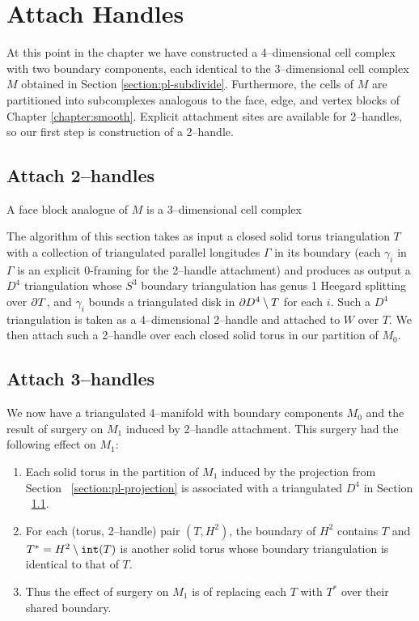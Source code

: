 \section{Attach Handles}
\label{section:pl-handle}

At this point in the chapter we have constructed a 4--dimensional cell complex with two boundary components, each identical to the 3--dimensional cell complex $M$ obtained in Section \ref{section:pl-subdivide}.
Furthermore, the cells of $M$ are partitioned into subcomplexes analogous to the face, edge, and vertex blocks of Chapter \ref{chapter:smooth}.
Explicit attachment sites are available for 2--handles, so our first step is construction of a 2--handle.

\subsection{Attach 2--handles}
\label{section:pl-2-handle}

A face block analogue of $M$ is a 3--dimensional cell complex 


The algorithm of this section takes as input a closed solid torus triangulation $T$ with a collection of triangulated parallel longitudes $\Gamma$ in its boundary (each $\gamma_i$ in $\Gamma$ is an explicit 0-framing for the 2--handle attachment) and produces as output a $D^4$ triangulation whose $S^3$ boundary triangulation has genus 1 Heegard splitting over $\partial T$, and $\gamma_i$ bounds a triangulated disk in $\partial D^4\setminus T$ for each $i$.
Such a $D^4$ triangulation is taken as a 4--dimensional 2--handle and attached to $W$ over $T$.
We then attach such a 2--handle over each closed solid torus in our partition of $M_0$.

\subsection{Attach 3--handles}

We now have a triangulated 4--manifold with boundary components $M_0$ and the result of surgery on $M_1$ induced by 2--handle attachment.
This surgery had the following effect on $M_1$:
\begin{enumerate}
	\item Each solid torus in the partition of $M_1$ induced by the projection from Section ~\ref{section:pl-projection} is associated with a triangulated $D^4$ in Section ~\ref{section:pl-2-handle}.
	\item For each (torus, 2--handle) pair $(T, H^2)$, the boundary of $H^2$ contains $T$ and $T^* = H^2\setminus \texttt{int}(T)$ is another solid torus whose boundary triangulation is identical to that of $T$.
	\item Thus the effect of surgery on $M_1$ is of replacing each $T$ with $T^*$ over their shared boundary.
\end{enumerate}

